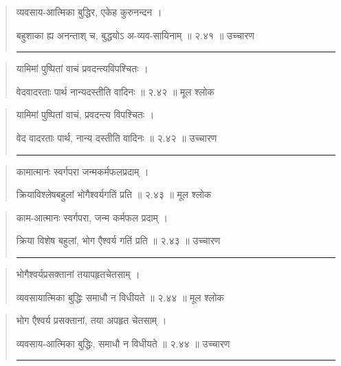 \begin{quotation}

व्यवसाय-आत्मिका बुद्धिर, एकेह कुरुनन्दन  ।  

बहुशाका ह्य अनन्ताश् च, बुद्धयोऽ अ-व्यव-सायिनाम्‌  ॥ २.४१ ॥  उच्चारण

\noindent\rule{16cm}{0.4pt} 
\end{quotation}


\begin{quotation}

यामिमां पुष्पितां वाचं प्रवदन्त्यविपश्चितः  ।  

वेदवादरताः पार्थ नान्यदस्तीति वादिनः  ॥ २.४२ ॥  मूल श्लोक
\end{quotation}

\begin{quotation}

यामिमां पुष्पितां वाचं, प्रवदन्त्य विपश्चितः  ।  

वेद वादरताः पार्थ, नान्य दस्तीति वादिनः  ॥ २.४२ ॥  उच्चारण

\noindent\rule{16cm}{0.4pt} 
\end{quotation}


\begin{quotation}

कामात्मानः स्वर्गपरा जन्मकर्मफलप्रदाम्‌  ।  

क्रियाविश्लेषबहुलां भोगैश्वर्यगतिं प्रति  ॥ २.४३ ॥  मूल श्लोक
\end{quotation}

\begin{quotation}

काम-आत्मानः स्वर्गपरा, जन्म कर्मफल प्रदाम्‌  ।  

क्रिया विशेष बहुलां, भोग एैश्वर्य गतिं प्रति  ॥ २.४३ ॥  उच्चारण

\noindent\rule{16cm}{0.4pt} 
\end{quotation}


\begin{quotation}

भोगैश्वर्यप्रसक्तानां तयापहृतचेतसाम्‌  ।  

व्यवसायात्मिका बुद्धिः समाधौ न विधीयते  ॥ २.४४ ॥  मूल श्लोक
\end{quotation}

\begin{quotation}

भोग एैश्वर्य प्रसक्तानां, तया अपहृत चेतसाम्‌  ।  

व्यवसाय-आत्मिका बुद्धिः, समाधौ न विधीयते  ॥ २.४४ ॥  उच्चारण

\noindent\rule{16cm}{0.4pt} 
\end{quotation}


